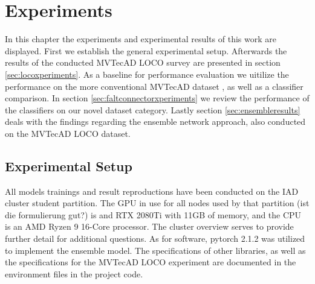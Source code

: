 \chapter{Experiments}
\label{chap:experiments}

In this chapter the experiments and experimental results of this work are displayed. First we establish the general experimental setup. Afterwards the results of the conducted MVTecAD LOCO \cite{LOCODentsAndScratchesBergmann2022}
survey are presented in section \ref{sec:locoxperiments}. As a baseline for performance evaluation we uitilize the performance on the more conventional MVTecAD dataset \cite{MVTEC_Bergmann_2021}, 
as well as a classifier comparison. In section \ref{sec:faltconnectorxperiments} we review the performance of the classifiers on our novel dataset category. Lastly section \ref{sec:ensembleresults} 
deals with the findings regarding the ensemble network approach, also conducted on the MVTecAD LOCO dataset.


\section{Experimental Setup}
\label{sec:experimentsetup}

All models trainings and result reproductions have been conducted on the IAD cluster student partition. The GPU in use for all nodes used by that partition (ist die formulierung gut?) is and 
RTX 2080Ti with 11GB of memory, and the CPU is an AMD Ryzen 9 16-Core processor. The cluster overview \cite{clusterdocs} serves to provide further detail for additional questions. As for software, 
pytorch 2.1.2 was utilized to implement the ensemble model. The specifications of other libraries, as well as the specifications for the MVTecAD LOCO experiment are documented in the 
environment files in the project code.



